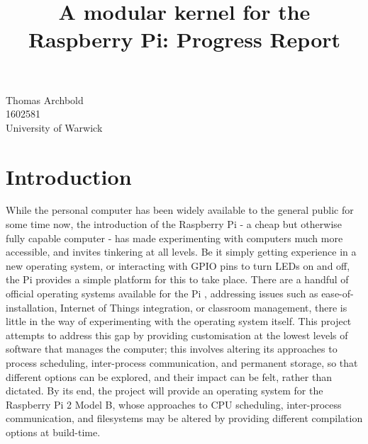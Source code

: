 \documentclass[10pt,a4paper]{article}
\title{A modular kernel for the Raspberry Pi: Progress Report}
\begin{document}
\maketitle

\begin{center}
    Thomas Archbold \\
    1602581 \\
    University of Warwick \\
\end{center}

\section{Introduction}
While the personal computer has been widely available to the general public for
some time now, the introduction of the Raspberry Pi - a cheap but otherwise
fully capable computer - has made experimenting with computers much more
accessible, and invites tinkering at all levels. Be it simply getting experience
in a new operating system, or interacting with GPIO pins to turn LEDs on and
off, the Pi provides a simple platform for this to take place. There are a
handful of official operating systems available for the Pi \cite{OSes},
addressing issues such as ease-of-installation, Internet of Things integration,
or classroom management, there is little in the way of experimenting with the
operating system itself. This project attempts to address this gap by providing
customisation at the lowest levels of software that manages the computer; this
involves altering its approaches to process scheduling, inter-process
communication, and permanent storage, so that different options can be explored,
and their impact can be felt, rather than dictated. By its end, the project will
provide an operating system for the Raspberry Pi 2 Model B, whose approaches to
CPU scheduling, inter-process communication, and filesystems may be altered by
providing different compilation options at build-time.
\end{document}
